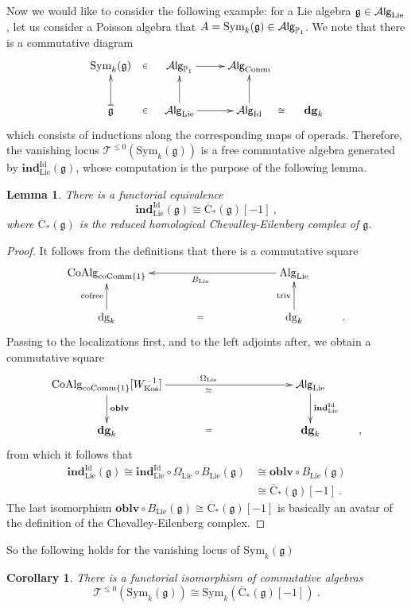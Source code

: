 \documentclass[10pt, oneside]{amsart}
\theoremstyle{plain}
\newtheorem{lemma}[equation]{Lemma}
\newtheorem{corollary}[equation]{Corollary}
\newcommand{\alg}{\mathrm{Alg}}
\newcommand{\Alg}{\mathcal{A}\text{\sf lg}}
\newcommand{\comm}{\mathrm{Comm}}
\newcommand{\coalg}{\mathrm{CoAlg}}
\newcommand{\ccomm}{\mathrm{coComm}}
\newcommand{\dg}{\mathrm{dg}}
\newcommand{\Dg}{\mathbf{dg}}
\newcommand{\Ind}{\mathbf{ind}}
\newcommand{\lie}{\mathrm{Lie}}
\newcommand{\Oblv}{\mathbf{oblv}}
\newcommand{\PP}{\mathbb{P}}
\newcommand{\sym}{\mathrm{Sym}}
\newcommand{\T}{\mathcal{T}}
\begin{document}
Now we would like to consider the following example: for a Lie algebra $\mathfrak{g} \in \Alg_\lie$, let us consider a Poisson algebra 
that $A = \sym_k(\mathfrak{g}) \in \Alg_{\PP_1}$.
We note that there is a commutative diagram
\[\xymatrix{
\sym_k(\mathfrak{g}) \ar@{}[r]|\in & \Alg_{\PP_1} \ar[r] & \Alg_\comm \\
\mathfrak{g} \ar@{|->}[u] \ar@{}[r]|\in & \Alg_\lie \ar[u]\ar[r] & \Alg_\text{Id} \ar[u] \ar@{}[r]|\cong & \Dg_k
}\]
which consists of inductions along the corresponding maps of operads. Therefore, the vanishing locus $\T^{\le 0}(\sym_k(\mathfrak{g}))$
is a free commutative algebra generated by $\Ind^\text{Id}_\lie(\mathfrak{g})$, whose computation is the purpose of the following lemma.
\begin{lemma}
There is a functorial equivalence
\begin{equation*}
\Ind^\mathrm{Id}_\lie(\mathfrak{g}) \cong \overline{\mathrm{C}}_*(\mathfrak{g})[-1] \:,
\end{equation*}
where $\overline{\mathrm{C}}_*(\mathfrak{g})$ is the reduced homological Chevalley-Eilenberg complex of $\mathfrak{g}$.
\end{lemma}
\begin{proof}

It follows from the definitions that there is a commutative square
\[\xymatrix{
\coalg_{\ccomm\{1\}} &&&& \alg_\lie \ar[llll]^{B_\lie} \\
\dg_k \ar[u]^{\text{cofree}} &&&& \dg_k \ar@{}[llll]|= \ar[u]^{\text{triv}} & .
}\]
Passing to the localizations first, and to the left adjoints after, we obtain a commutative square
\[\xymatrix{
\coalg_{\ccomm\{1\}}[W^{-1}_\mathrm{Kos}] \ar[d]^{\Oblv} \ar[rrrr]_\simeq^{\Omega_\lie} &&&& \Alg_\lie \ar[d]^{\Ind^\mathrm{Id}_\lie} \\
\Dg_k &&&& \Dg_k \ar@{}[llll]|= & ,
}\]
from which it follows that
\begin{equation*}
\begin{split}
\Ind^\mathrm{Id}_\lie(\mathfrak{g}) \cong \Ind^\mathrm{Id}_\lie \circ \Omega_\lie \circ B_\lie (\mathfrak{g}) &\cong \Oblv \circ B_\lie(\mathfrak{g}) \\
& \cong \overline{\mathrm{C}}_*(\mathfrak{g})[-1] \:.
\end{split}
\end{equation*}
The last isomorphism $\Oblv \circ B_\lie(\mathfrak{g}) \cong \overline{\mathrm{C}}_*(\mathfrak{g})[-1]$ is basically an avatar of
the definition of the Chevalley-Eilenberg complex.
\end{proof}
So the following holds for the vanishing locus of $\sym_k (\mathfrak{g})$
\begin{corollary}
There is a functorial isomorphism of commutative algebras
\begin{equation*}
\T^{\le 0}(\sym_k(\mathfrak{g})) \cong \sym_k(\overline{\mathrm{C}}_*(\mathfrak{g})[-1]) \:.
\end{equation*}
\end{corollary}
\end{document}
